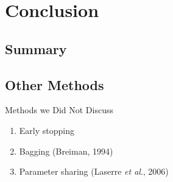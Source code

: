 \documentclass[pdf]{beamer}
\begin{document}
\section{Conclusion}
	\subsection{Summary}
	
	\subsection{Other Methods}
		
		\begin{frame}{Methods we Did Not Discuss}
			\begin{enumerate}
				\item Early stopping
				\item Bagging (Breiman, 1994)
				\item Parameter sharing (Laserre \textit{et al}., 2006)
			\end{enumerate}
		\end{frame}
\end{document}
